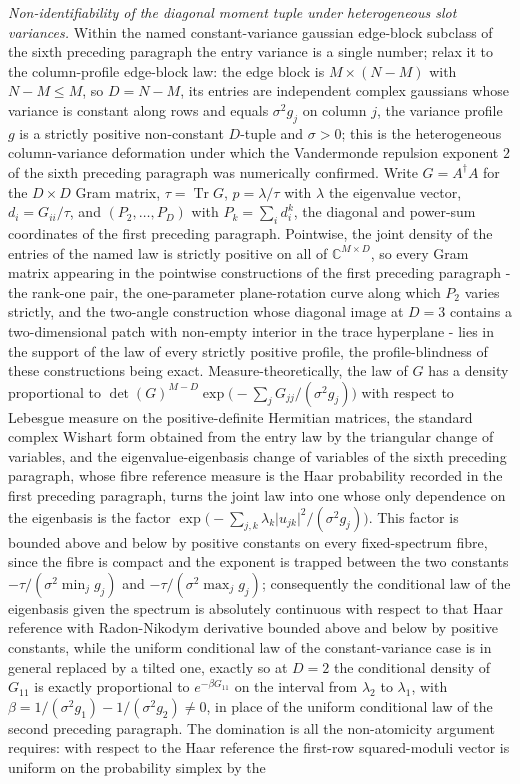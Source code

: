 \emph{Non-identifiability of the diagonal moment tuple under heterogeneous slot variances.} Within the named constant-variance gaussian edge-block subclass of the sixth preceding paragraph the entry variance is a single number; relax it to the column-profile edge-block law: the edge block is \(M\times(N-M)\) with \(N-M\le M\), so \(D=N-M\), its entries are independent complex gaussians whose variance is constant along rows and equals \(\sigma^{2}g_{j}\) on column \(j\), the variance profile \(g\) is a strictly positive non-constant \(D\)-tuple and \(\sigma>0\); this is the heterogeneous column-variance deformation under which the Vandermonde repulsion exponent \(2\) of the sixth preceding paragraph was numerically confirmed. Write \(G=A^{\dagger}A\) for the \(D\times D\) Gram matrix, \(\tau=\operatorname{Tr}G\), \(p=\lambda/\tau\) with \(\lambda\) the eigenvalue vector, \(d_{i}=G_{ii}/\tau\), and \((P_{2},\dots,P_{D})\) with \(P_{k}=\sum_{i}d_{i}^{k}\), the diagonal and power-sum coordinates of the first preceding paragraph. Pointwise, the joint density of the entries of the named law is strictly positive on all of \(\mathbb{C}^{M\times D}\), so every Gram matrix appearing in the pointwise constructions of the first preceding paragraph - the rank-one pair, the one-parameter plane-rotation curve along which \(P_{2}\) varies strictly, and the two-angle construction whose diagonal image at \(D=3\) contains a two-dimensional patch with non-empty interior in the trace hyperplane - lies in the support of the law of every strictly positive profile, the profile-blindness of these constructions being exact. Measure-theoretically, the law of \(G\) has a density proportional to \(\det(G)^{M-D}\exp\!\bigl(-\sum_{j}G_{jj}/(\sigma^{2}g_{j})\bigr)\) with respect to Lebesgue measure on the positive-definite Hermitian matrices, the standard complex Wishart form obtained from the entry law by the triangular change of variables, and the eigenvalue-eigenbasis change of variables of the sixth preceding paragraph, whose fibre reference measure is the Haar probability recorded in the first preceding paragraph, turns the joint law into one whose only dependence on the eigenbasis is the factor \(\exp\!\bigl(-\sum_{j,k}\lambda_{k}\lvert u_{jk}\rvert^{2}/(\sigma^{2}g_{j})\bigr)\). This factor is bounded above and below by positive constants on every fixed-spectrum fibre, since the fibre is compact and the exponent is trapped between the two constants \(-\tau/(\sigma^{2}\min_{j}g_{j})\) and \(-\tau/(\sigma^{2}\max_{j}g_{j})\); consequently the conditional law of the eigenbasis given the spectrum is absolutely continuous with respect to that Haar reference with Radon-Nikodym derivative bounded above and below by positive constants, while the uniform conditional law of the constant-variance case is in general replaced by a tilted one, exactly so at \(D=2\) the conditional density of \(G_{11}\) is exactly proportional to \(e^{-\beta G_{11}}\) on the interval from \(\lambda_{2}\) to \(\lambda_{1}\), with \(\beta=1/(\sigma^{2}g_{1})-1/(\sigma^{2}g_{2})\neq0\), in place of the uniform conditional law of the second preceding paragraph. The domination is all the non-atomicity argument requires: with respect to the Haar reference the first-row squared-moduli vector is uniform on the probability simplex by the 